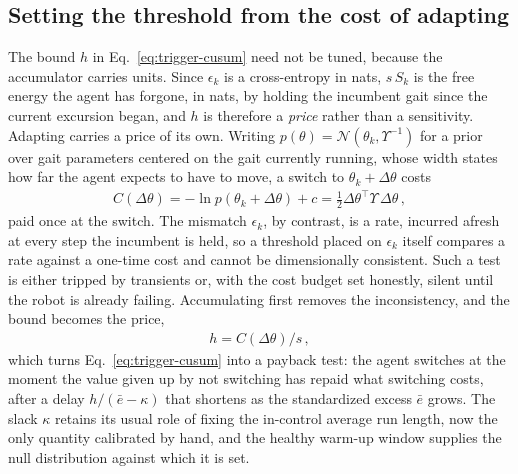 \documentclass[letterpaper, 10 pt, conference]{ieeeconf}  %
\newcommand{\cN}{\mathcal{N}}
\begin{document}
\subsection{Setting the threshold from the cost of adapting}
\label{sec:threshold}

The bound $h$ in Eq.~\ref{eq:trigger-cusum} need not be tuned, because the accumulator carries units.
Since $\epsilon_k$ is a cross-entropy in nats, $s\,S_k$ is the free energy the agent has forgone, in nats, by holding the incumbent gait since the current excursion began, and $h$ is therefore a \emph{price} rather than a sensitivity.
Adapting carries a price of its own.
Writing $p(\theta) = \cN(\theta_k, \Upsilon^{-1})$ for a prior over gait parameters centered on the gait currently running, whose width states how far the agent expects to have to move, a switch to $\theta_k + \Delta\theta$ costs
\begin{align} \label{eq:switch-cost}
    C(\Delta\theta) = -\ln p(\theta_k + \Delta\theta) + c = \tfrac{1}{2}\Delta\theta^{\top}\Upsilon\,\Delta\theta \,,
\end{align}
paid once at the switch.
The mismatch $\epsilon_k$, by contrast, is a rate, incurred afresh at every step the incumbent is held, so a threshold placed on $\epsilon_k$ itself compares a rate against a one-time cost and cannot be dimensionally consistent.
Such a test is either tripped by transients or, with the cost budget set honestly, silent until the robot is already failing.
Accumulating first removes the inconsistency, and the bound becomes the price,
\begin{align} \label{eq:threshold}
    h = C(\Delta\theta)/s \,,
\end{align}
which turns Eq.~\ref{eq:trigger-cusum} into a payback test: the agent switches at the moment the value given up by not switching has repaid what switching costs, after a delay $h/(\bar{e} - \kappa)$ that shortens as the standardized excess $\bar{e}$ grows.
The slack $\kappa$ retains its usual role of fixing the in-control average run length, now the only quantity calibrated by hand, and the healthy warm-up window supplies the null distribution against which it is set.
\end{document}
